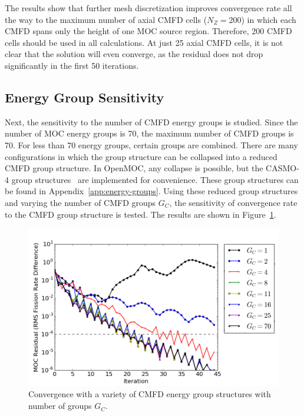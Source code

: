 The results show that further mesh discretization improves convergence rate all the way to the maximum number of axial \ac{CMFD} cells ($N_Z = 200$) in which each \ac{CMFD} spans only the height of one \ac{MOC} source region. Therefore, 200 \ac{CMFD} cells should be used in all calculations. At just 25 axial \ac{CMFD} cells, it is not clear that the solution will even converge, as the residual does not drop significantly in the first 50 iterations.

\newpage
\subsection{Energy Group Sensitivity}

Next, the sensitivity to the number of \ac{CMFD} energy groups is studied. Since the number of \ac{MOC} energy groups is 70, the maximum number of \ac{CMFD} groups is 70. For less than 70 energy groups, certain groups are combined. There are many configurations in which the group structure can be collapsed into a reduced \ac{CMFD} group structure. In OpenMOC, any collapse is possible, but the CASMO-4 group structures~\cite{edenius1995casmo} are implemented for convenience. These group structures can be found in Appendix~\ref{app:energy-groups}. Using these reduced group structures and varying the number of \ac{CMFD} groups $G_C$, the sensitivity of convergence rate to the \ac{CMFD} group structure is tested. The results are shown in Figure~\ref{fig:cmfd-energy-groups}.

\begin{figure}[h!]
	\centering
	\includegraphics[width=0.9\linewidth]{figures/results/sensitivity/cmfd-groups.png}
	\caption[]{Convergence with a variety of \ac{CMFD} energy group structures with number of groups $G_C$.}
	\label{fig:cmfd-energy-groups}
\end{figure}

